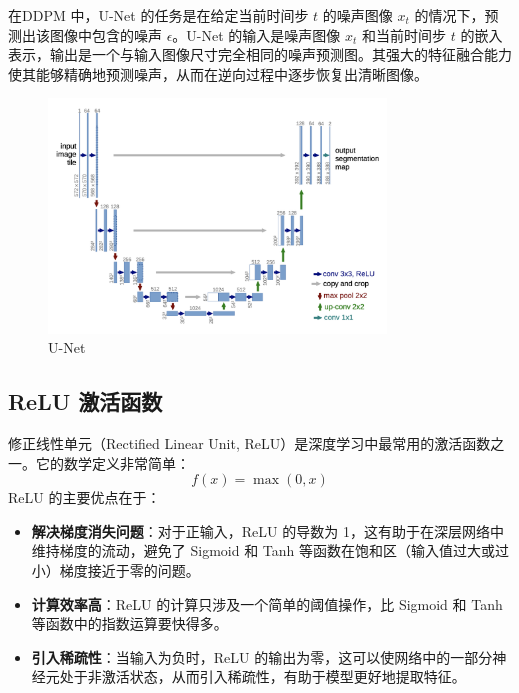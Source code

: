 \documentclass{ctexart}
\begin{document}
\noindent 
在DDPM 中，U-Net 的任务是在给定当前时间步 $t$ 的噪声图像 $x_t$ 的情况下，预测出该图像中包含的噪声 $\epsilon$。U-Net 的输入是噪声图像 $x_t$ 和当前时间步 $t$ 的嵌入表示，输出是一个与输入图像尺寸完全相同的噪声预测图。其强大的特征融合能力使其能够精确地预测噪声，从而在逆向过程中逐步恢复出清晰图像。

 \begin{figure}[H]
     \centering
     \includegraphics[width=0.8\textwidth]{unet.png}
     \caption{U-Net}
     \label{fig:unet}
 \end{figure}

\subsection{ReLU 激活函数}
\noindent
修正线性单元（Rectified Linear Unit, ReLU）是深度学习中最常用的激活函数之一。它的数学定义非常简单：
$$ f(x) = \max(0, x) $$
ReLU 的主要优点在于：
\begin{itemize}
    \item \textbf{解决梯度消失问题}：对于正输入，ReLU 的导数为 1，这有助于在深层网络中维持梯度的流动，避免了 Sigmoid 和 Tanh 等函数在饱和区（输入值过大或过小）梯度接近于零的问题。
    \item \textbf{计算效率高}：ReLU 的计算只涉及一个简单的阈值操作，比 Sigmoid 和 Tanh 等函数中的指数运算要快得多。
    \item \textbf{引入稀疏性}：当输入为负时，ReLU 的输出为零，这可以使网络中的一部分神经元处于非激活状态，从而引入稀疏性，有助于模型更好地提取特征。
\end{itemize}
\end{document}
